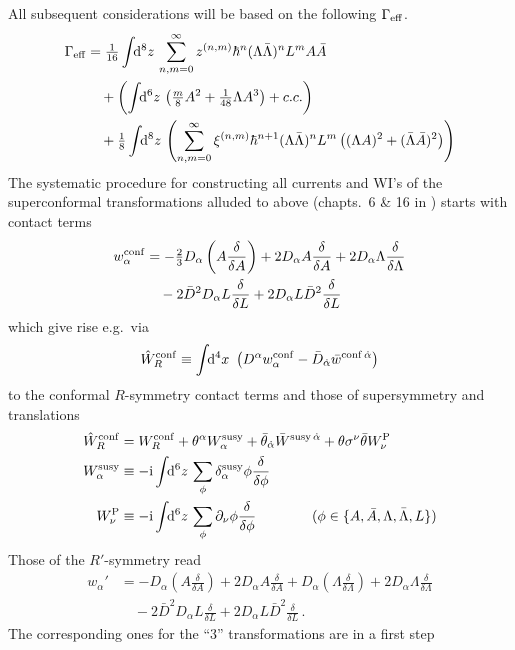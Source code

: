 \documentclass[a4paper,12pt]{article}
\newcommand{\I}{{\rm i}}
\def\pr{\partial}
\newcommand{\dx}{\!\!{\rm d}^4x\,\,}
\newcommand{\dS}{\!\!{\rm d}^6z\,}
\newcommand{\dV}{\!\!{\rm d}^8z\,}
\newcommand{\Geff}{\Gamma_{\rm eff}}
\newcommand{\al}{\alpha}
\newcommand{\da}{{\dot\alpha}}
\newcommand{\tfr}[2]{{\textstyle \frac{#1}{#2}}}
\newcommand{\fdq}[2]{\frac{\delta #1}{\delta #2}}
\begin{document}
All subsequent  considerations will be based on the following $\Geff$.
\begin{align}
\Geff &= \tfr{1}{16}\int \dV  \sum_{n,m=0}^\infty z^{(n,m)} \hbar^n (\Lambda
  \bar \Lambda)^n L^m A  \bar A \nonumber \\
& \quad
+ \left( \int \dS \left( \tfr{m}{8} A^2 +\tfr{1}{48} \Lambda A^3  \right) +
  c.c. \right) 
 \nonumber \\
& \quad
+ \tfr{1}{8}
\int \dV  \left( \sum_{n,m=0}^\infty \xi^{(n,m)} \hbar^{n+1} 
(\Lambda \bar \Lambda)^{n} L^m \left( (\Lambda A) ^2 + (\bar \Lambda \bar A)
  ^2  \right)  \right) \label{Geff}
\end{align}
The systematic procedure for constructing all currents and WI's of the
superconformal transformations alluded to above (chapts.\ 6 \& 16 in \cite{PSbook})
starts with contact terms
\begin{align}
w_\al^{\rm conf} &= - \tfr{2}{3} D_\al \left(A \fdq{}{A} \right) 
+  2 D_\al A \fdq{}{A} 
+  2 D_\al\Lambda \fdq{}{\Lambda} \nonumber\\
& \quad - 2\bar D^2  D_\al L \fdq{}{L}  + 2D_\al  L \bar D^2 \fdq{}{L}
\end{align}
which give rise e.g.\ via
\begin{equation}
\hat W_R^{\rm conf} \equiv \int \dx \left( D^\al w_\al^{\rm conf} - \bar
  D_\da \bar w^{{\rm conf}\, \da} \right)
\end{equation}
to the conformal $R$-symmetry contact terms and those of supersymmetry and
translations
\begin{align}
\hat W_R^{\rm conf} &= W_R^{\rm conf} + \theta^\al W_\al^{\rm susy} + \bar
\theta_\da \bar W^{{\rm susy} \, \da}
+ \theta \sigma^\nu \bar\theta W_\nu^{\rm P} \\
W_\al^{\rm susy} &\equiv -\I \int \dS \sum_\phi \delta_\al^{\rm susy} \phi
\fdq{}{\phi} \\
W_\nu^{\rm P} &\equiv  -\I \int \dS \sum_\phi \pr_\nu \phi \fdq{}{\phi} 
\qquad \qquad  (\phi  \in \{ A, \bar A, \Lambda, \bar\Lambda, L\} ) 
\end{align}
Those of the $R'$-symmetry read
\begin{align}
w_\al' &= - D_\al \left(A \fdq{}{A} \right) 
+  2 D_\al A \fdq{}{A} 
+  D_\al \left( \Lambda \fdq{}{\Lambda} \right) + 2 D_\al\Lambda \fdq{}{\Lambda} \nonumber\\
& \quad - 2\bar D^2  D_\al L \fdq{}{L}  + 2D_\al  L \bar D^2 \fdq{}{L}
 \,.
\end{align}
The corresponding ones for the ``3'' transformations are in a first step
\end{document}
